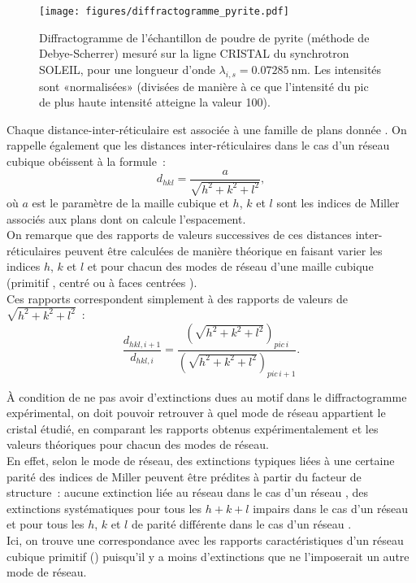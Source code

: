 %
%
\begin{figure}
\caption{Diffractogramme de l'échantillon de poudre de pyrite (méthode de Debye-Scherrer) mesuré sur la ligne CRISTAL du synchrotron SOLEIL, pour une longueur d'onde \(\lambda_{i,s} = \SI{0.07285}{\nano\metre}\). Les intensités sont «normalisées» (divisées de manière à ce que l'intensité du pic de plus haute intensité atteigne la valeur 100).}
\texttt{[image: figures/diffractogramme\_pyrite.pdf]}
\label{fig:soleilPowderDiffractogram}
\end{figure}
%
Chaque distance-inter-réticulaire est associée à une famille de plans donnée .
On rappelle également que les distances inter-réticulaires dans le cas d'un réseau cubique obéissent à la formule~:
\begin{equation}
d_{hkl} = \frac{a}{\sqrt{h^2 + k^2 + l^2}},
\label{eq:dhklVsA}
\end{equation}
où \(a\) est le paramètre de la maille cubique et \(h\), \(k\) et \(l\) sont les indices de Miller associés aux plans dont on calcule l'espacement.\\
On remarque que des rapports de valeurs successives de ces distances inter-réticulaires peuvent être calculées de manière théorique en faisant varier les indices \(h\), \(k\) et \(l\) et pour chacun des modes de réseau d'une maille cubique (primitif , centré  ou à faces centrées ).\\
Ces rapports correspondent simplement à des rapports de valeurs de \(\sqrt{h^2 + k^2 + l^2}\)~:
\begin{equation}
\frac{d_{hkl,i+1}}{d_{hkl,i}} = \frac{\left(\sqrt{h^2 + k^2 + l^2}\right)_{pic\, i}}{\left(\sqrt{h^2 + k^2 + l^2}\right)_{pic\, i+1}}.
\end{equation}

À condition de ne pas avoir d'extinctions dues au motif dans le diffractogramme expérimental, on doit pouvoir retrouver à quel mode de réseau appartient le cristal étudié, en comparant les rapports obtenus expérimentalement et les valeurs théoriques pour chacun des modes de réseau.\\
En effet, selon le mode de réseau, des extinctions typiques liées à une certaine parité des indices de Miller peuvent être prédites à partir du facteur de structure~: aucune extinction liée au réseau dans le cas d'un réseau , des extinctions systématiques pour tous les \(h + k + l\) impairs dans le cas d'un réseau  et pour tous les \(h\), \(k\) et \(l\) de parité différente dans le cas d'un réseau .\\
Ici, on trouve une correspondance avec les rapports caractéristiques d'un réseau cubique primitif () puisqu'il y a moins d'extinctions que ne l'imposerait un autre mode de réseau.


